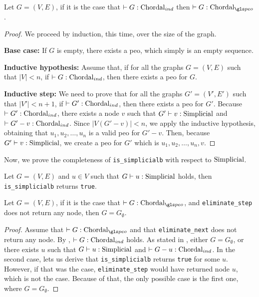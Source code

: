 \begin{lemma}\label{lem:chordal21}
    Let $G = (V, E)$, if it is the case that $\chordalind{G}$ then $\chordalpeo{G}$.
\end{lemma}
\begin{proof}
    We proceed by induction, this time, over the size of the graph.

    \textbf{Base case:}
    If $G$ is empty, there exists a \gls{peo}, which simply is an empty sequence.

    \medskip

    \textbf{Inductive hypothesis:}
    Assume that, if for all the graphs $G = (V, E)$ such that $|V| < n$, if $\chordalind{G}$, then there exists a \gls{peo} for $G$.

    \medskip

    \textbf{Inductive step:}
    We need to prove that for all the graphs $G' = (V', E')$ such that $|V'| < n+1$, if $\chordalind{G'}$, then there exists a \gls{peo} for $G'$.
    Because $\chordalind{G'}$, there exists a node $v$ such that $\simplicial{v}{G'}$ and $\chordalind{G' - v}$. Since $|V(G' - v)| < n$, we apply the inductive hypothesis, obtaining that $u_1, u_2, \dots, u_n$ is a valid \gls{peo} for $G' - v$. Then, because $\simplicial{v}{G'}$, we create a \gls{peo} for $G'$ which is $u_1, u_2, \dots, u_n, v$.
\end{proof}

Now, we prove the completeness of \texttt{is\_simplicialb} with respect to $\simplicialsymbol$.

\begin{lemma}\label{lem:sbcomp}
Let $G = (V, E)$ and $u \in V$ such that $\simplicial{u}{G}$ holds, then \texttt{is\_simplicialb} returns \texttt{true}. \Coqed
\end{lemma}

\begin{lemma}\label{lem:inv-elim-2}
    Let $G = (V, E)$, if it is the case that $\chordalpeo{G}$, and \texttt{eliminate\_step} does not return any node, then $G = G_\emptyset$. \Coqed
\end{lemma}
\begin{proof}
    Assume that $\chordalpeo{G}$ and that \texttt{eliminate\_next} does not return any node. By , $\chordalind{G}$ holds. As stated in , either $G = G_\emptyset$, or there exists $u$ such that $\simplicial{u}{G}$ and $\chordalind{G - u}$. In the second case,  lets us derive that \texttt{is\_simplicialb} returns \texttt{true} for some $u$. However, if that was the case, \texttt{eliminate\_step} would have returned node $u$, which is not the case. Because of that, the only possible case is the first one, where $G = G_\emptyset$.
\end{proof}


